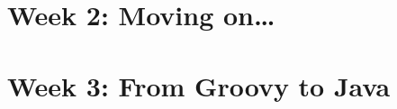 \documentclass[11pt,a4paper]{book}
\begin{document}
\chapter{Week 2: Moving on\ldots}



%
% 
\chapter{Week 3: From Groovy to Java}




\end{document}
